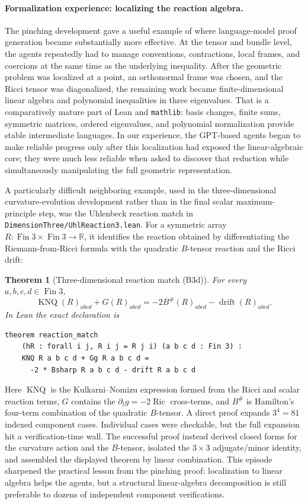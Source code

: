 \documentclass[11pt]{article}
\theoremstyle{plain}
\newtheorem{theorem}{Theorem}[section]
\theoremstyle{definition}
\theoremstyle{remark}
\newcommand{\Ric}{\operatorname{Ric}}
\newcommand{\leanfile}[1]{\nolinkurl{#1}}
\newcommand{\rffile}[1]{\leanfile{#1}}
\begin{document}
\paragraph{Formalization experience: localizing the reaction algebra.}
The pinching development gave a useful example of where language-model proof
generation became substantially more effective.  At the tensor and bundle
level, the agents repeatedly had to manage conventions, contractions, local
frames, and coercions at the same time as the underlying inequality.  After
the geometric problem was localized at a point, an orthonormal frame was
chosen, and the Ricci tensor was diagonalized, the remaining work became
finite-dimensional linear algebra and polynomial inequalities in three
eigenvalues.  That is a comparatively mature part of Lean and
\texttt{mathlib}: basis changes, finite sums, symmetric matrices, ordered
eigenvalues, and polynomial normalization provide stable intermediate
languages.  In our experience, the GPT-based agents began to make reliable
progress only after this localization had exposed the linear-algebraic core;
they were much less reliable when asked to discover that reduction while
simultaneously manipulating the full geometric representation.

A particularly difficult neighboring example, used in the
three-dimensional curvature-evolution development rather than in the final
scalar maximum-principle step, was the Uhlenbeck reaction match in
\rffile{DimensionThree/UhlReaction3.lean}.  For a symmetric array
\(R\colon\operatorname{Fin}3\times\operatorname{Fin}3\to\mathbb R\), it
identifies the reaction obtained by differentiating the
Riemann-from-Ricci formula with the quadratic \(B\)-tensor reaction and the
Ricci drift:
\begin{theorem}[Three-dimensional reaction match (B3d)]
\label{thm:dim3-reaction-match}
For every \(a,b,c,d\in\operatorname{Fin}3\),
\[
  \operatorname{KNQ}(R)_{abcd}+G(R)_{abcd}
  =
  -2B^\#(R)_{abcd}-\operatorname{drift}(R)_{abcd}.
\]
In Lean the exact declaration is
\begin{Verbatim}[breaklines=true,breakanywhere=true,fontsize=\small]
theorem reaction_match
    (hR : forall i j, R i j = R j i) (a b c d : Fin 3) :
    KNQ R a b c d + Gg R a b c d =
      -2 * Bsharp R a b c d - drift R a b c d
\end{Verbatim}
\end{theorem}
Here \(\operatorname{KNQ}\) is the Kulkarni--Nomizu expression formed from the
Ricci and scalar reaction terms, \(G\) contains the
\(\partial_tg=-2\Ric\) cross-terms, and \(B^\#\) is Hamilton's four-term
combination of the quadratic \(B\)-tensor.  A direct proof expands
\(3^4=81\) indexed component cases.  Individual cases were checkable, but the
full expansion hit a verification-time wall.  The successful proof instead
derived closed forms for the curvature action and the \(B\)-tensor, isolated
the \(3\times3\) adjugate/minor identity, and assembled the displayed theorem
by linear combination.  This episode sharpened the practical lesson from the
pinching proof: localization to linear algebra helps the agents, but a
structural linear-algebra decomposition is still preferable to dozens of
independent component verifications.
\end{document}
